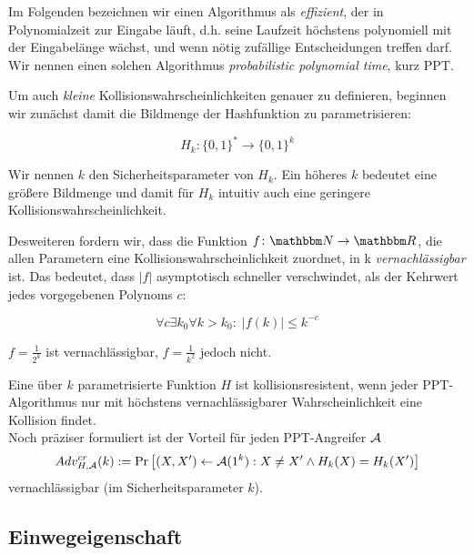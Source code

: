 Im Folgenden bezeichnen wir einen Algorithmus als \emph{effizient}, der in Polynomialzeit zur Eingabe läuft, d.h. seine Laufzeit höchstens
polynomiell mit der Eingabelänge wächst, und wenn nötig zufällige Entscheidungen treffen darf. Wir nennen einen solchen Algorithmus \textit{probabilistic
polynomial time}, kurz PPT.

Um auch \emph{kleine} Kollisionswahrscheinlichkeiten genauer zu definieren, beginnen wir zunächst damit die Bildmenge der Hashfunktion zu parametrisieren:

\begin{equation*}
H_k \colon \{0,1\}^* \rightarrow \{0,1\}^k
\end{equation*}

Wir nennen $k$ den Sicherheitsparameter von $H_k$. Ein höheres $k$ bedeutet eine größere Bildmenge und damit für $H_k$ intuitiv auch eine geringere
Kollisionswahrscheinlichkeit.

Desweiteren fordern wir, dass die Funktion $f \colon \N \rightarrow \R$, die allen Parametern eine Kollisionswahrscheinlichkeit zuordnet, in k
\emph{vernachlässigbar} ist. Das bedeutet, dass $|f|$ asymptotisch schneller verschwindet, als der Kehrwert jedes vorgegebenen Polynoms $c$:

\begin{equation*}
\forall c \exists k_0 \forall k > k_0: \; \left| f(k) \right| \leq k^{-c}
\end{equation*}

\begin{beispiel}
$f = \frac{1}{2^k}$ ist vernachlässigbar, $f = \frac{1}{k^2}$ jedoch nicht.
\end{beispiel}
\vspace{10pt}

\begin{definition}[Kollisionsresistenz]
Eine über $k$ parametrisierte Funktion $H$ ist kollisionsresistent, wenn jeder PPT-Algorithmus nur mit höchstens vernachlässigbarer Wahrscheinlichkeit eine Kollision findet.~\\
Noch präziser formuliert ist der Vorteil für jeden PPT-Angreifer $\mathcal{A}$
\begin{equation*}
Adv^{cr}_{H,\mathcal{A}}(k):= \Pr \left[ (X, X') \leftarrow \mathcal{A}(1^k) : X \neq X' \land H_k(X) = H_k(X')\right]
\end{equation*}
vernachlässigbar (im Sicherheitsparameter $k$).
\end{definition}

\subsection{Einwegeigenschaft}


